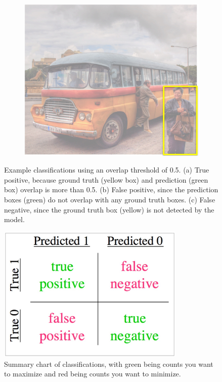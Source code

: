 \documentclass{article}
\begin{document}
\begin{figure}[h]
\begin{subfigure}{0.32\textwidth}
    \caption{}
  \end{subfigure}
  \hspace*{\fill} %
  \begin{subfigure}{0.32\textwidth}
    \includegraphics[width=\linewidth]{false_neg.jpg}
    \caption{}
  \end{subfigure}
  \hspace*{\fill} %
  \caption{Example classifications using an overlap threshold of 0.5. (a) True positive, because ground truth (yellow box) and prediction (green box) overlap is more than 0.5. (b) False positive, since the prediction boxes (green) do not overlap with any ground truth boxes. (c) False negative, since the ground truth box (yellow) is not detected by the model.}
  \label{fig:evaluations}
\end{figure}

\begin{figure}[ht]
\centering
	\includegraphics[width=0.8\textwidth]{chart.jpg}
    \caption{Summary chart of classifications, with green being counts you want to maximize and red being counts you want to minimize.}
    \label{fig:eval_chart}
\end{figure}
\end{document}
